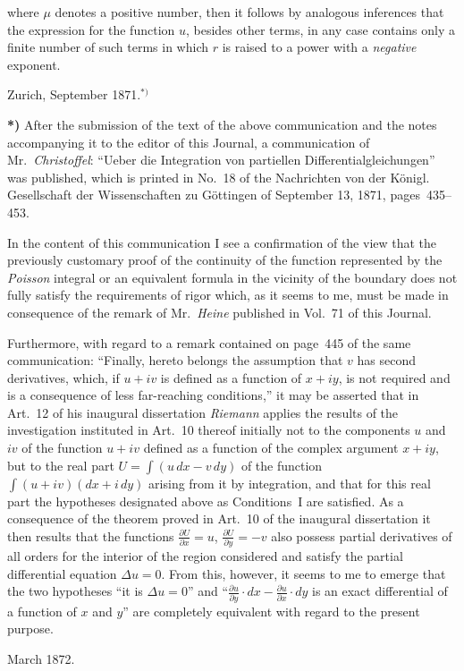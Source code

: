 \documentclass{article}
\begin{document}
where $\mu$ denotes a positive number, then it follows by analogous inferences that the expression for the function $u$, besides other terms, in any case contains only a finite number of such terms in which $r$ is raised to a power with a \emph{negative} exponent.



Zurich, September 1871.${}^{*)}$



\textbf{*)} After the submission of the text of the above communication and the notes accompanying it to the editor of this Journal, a communication of Mr.~\emph{Christoffel}: ``Ueber die Integration von partiellen Differentialgleichungen'' was published, which is printed in No.~18 of the Nachrichten von der Königl. Gesellschaft der Wissenschaften zu Göttingen of September 13, 1871, pages~435--453.







In the content of this communication I see a confirmation of the view that the previously customary proof of the continuity of the function represented by the \emph{Poisson} integral or an equivalent formula in the vicinity of the boundary does not fully satisfy the requirements of rigor which, as it seems to me, must be made in consequence of the remark of Mr.~\emph{Heine} published in Vol.~71 of this Journal.







Furthermore, with regard to a remark contained on page~445 of the same communication: ``Finally, hereto belongs the assumption that $v$ has second derivatives, which, if $u + iv$ is defined as a function of $x + iy$, is not required and is a consequence of less far-reaching conditions,'' it may be asserted that in Art.~12 of his inaugural dissertation \emph{Riemann} applies the results of the investigation instituted in Art.~10 thereof initially not to the components $u$ and $iv$ of the function $u + iv$ defined as a function of the complex argument $x + iy$, but to the real part $U = \displaystyle\int(u\,dx - v\,dy)$ of the function $\displaystyle\int(u + iv)(dx + i\,dy)$ arising from it by integration, and that for this real part the hypotheses designated above as Conditions~I are satisfied. As a consequence of the theorem proved in Art.~10 of the inaugural dissertation it then results that the functions $\frac{\partial U}{\partial x} = u$, $\frac{\partial U}{\partial y} = -v$ also possess partial derivatives of all orders for the interior of the region considered and satisfy the partial differential equation $\Delta u = 0$. From this, however, it seems to me to emerge that the two hypotheses ``it is $\Delta u = 0$'' and ``$\frac{\partial u}{\partial y} \cdot dx - \frac{\partial u}{\partial x} \cdot dy$ is an exact differential of a function of $x$ and $y$'' are completely equivalent with regard to the present purpose.





March 1872.
\end{document}
